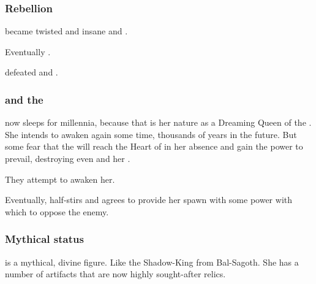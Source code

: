 \subsubsection{Rebellion}
\Tiamat became twisted and insane and . 

Eventually \Tiamat {}. 

\Sethicus defeated \Tiamat and .





\subsubsection{\Xserasshana{} and the \firstgendragons}
\Tiamat{} now sleeps for millennia, 
because that is her nature as a Dreaming Queen of the \ophidians{}. She intends to awaken again some time, thousands of years in the future. But some \dragons{} fear that the \banes{} will reach the Heart of \Miith{} in her absence and gain the power to prevail, destroying even \Tiamat{} and her \firstgendragons. 

They attempt to awaken her.

Eventually, \Tiamat{} half-stirs and agrees to provide her spawn with some power with which to oppose the enemy. 





\subsubsection{Mythical status}
\Tiamat{} is a mythical, divine figure. 
Like the Shadow-King from Bal-Sagoth. 
She has a number of artifacts that are now highly sought-after relics. 










